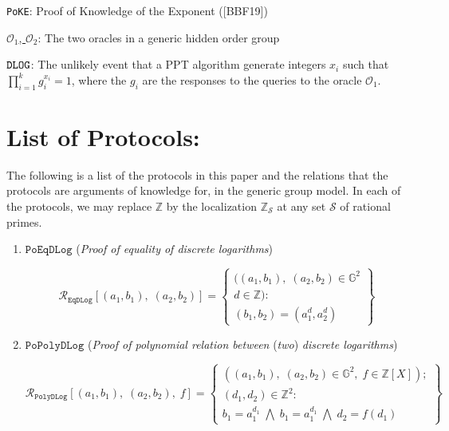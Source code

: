 \documentclass[11pt, lettersize, notitlepage, leqno, footskip=0.6cm]{article}
\newcommand{\bz}{\mathbb Z}
\newcommand{\ttt}{\texttt}
\newcommand{\mc}{\mathcal}
\newcommand{\mb}{\mathbb}
\newcommand{\noin}{\noindent}
\numberwithin{equation}{section}
\begin{document}
{{{\noin \verb|PoKE|: Proof of Knowledge of the Exponent ([BBF19]) \vspace{0.1cm}

\noin \hyperlink{Oracles}{$\mc{O}_1$, $\mc{O}_2$}: The two oracles in a generic hidden order group \vspace{0.1cm}

\noin \hyperlink{DLOG}{$\tt{DLOG}$}: The unlikely event that a PPT algorithm generate integers $x_i$ such that $\prod_{i=1}^k g_i^{x_i} = 1$, where the $g_i$ are the responses to the queries to the oracle $\mc{O}_1.$

\section{\fontsize{11}{11}\selectfont List of Protocols:}

\hypertarget{List}{The following is a list of the protocols in this paper and the relations that the protocols are arguments of knowledge for, in the generic group model. In each of the protocols, we may replace $\bz$ by the localization $\bz_{\mc{S}}$ at any set $\mc{S}$ of rational primes.}

\begin{enumerate}[wide, labelwidth=!, labelindent=0pt]

\item $\ttt{PoEqDLog}$ (\textit{Proof of equality of discrete logarithms}) \vspace{-0.3cm}

\[
  \mc{R}_{{\ttt{EqDLog}}}[(a_1, b_1),\;(a_2,b_2)] = \left\{\begin{array}{l}
    ((a_1, b_1), \; (a_2,b_2)\in\mb{G}^2\\
    d\in\mb{Z}): \\
    (b_1,b_2) = (a_1^d,a_2^d)
  \end{array}\right\}
\]

 

\item $\ttt{PoPolyDLog}$ (\textit{Proof of polynomial relation between} (\textit{two}) \textit{discrete logarithms})\vspace{-0.3cm}

\[
  \mc{R}_{{\ttt{PolyDLog}}}[(a_1, b_1),\;(a_2,b_2),\;f] = \left\{\begin{array}{l}
    ((a_1, b_1), \; (a_2,b_2)\in\mb{G}^2,\;f\in\bz[X]);\\
    (d_1, d_2)\in\mb{Z}^2: \\
    b_1 = a_1^{d_1}\; \bigwedge\; b_1 = a_1^{d_1}\; \bigwedge \;d_2 = f(d_1)
  \end{array}\right\}
\]


\end{enumerate}}}}
\end{document}
